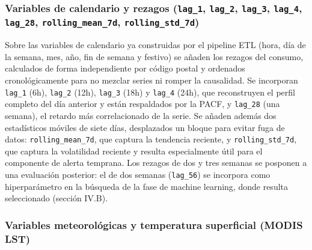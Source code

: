 \documentclass[12pt, a4paper]{article}
\begin{document}
\subsubsection{Variables de calendario y rezagos (\texttt{lag\_1}, \texttt{lag\_2}, \texttt{lag\_3}, \texttt{lag\_4}, \texttt{lag\_28}, \texttt{rolling\_mean\_7d}, \texttt{rolling\_std\_7d})}


Sobre las variables de calendario ya construidas por el pipeline ETL (hora, día de la semana, mes, año, fin de semana y festivo) se añaden los rezagos del consumo, calculados de forma independiente por código postal y ordenados cronológicamente para no mezclar series ni romper la causalidad. Se incorporan \texttt{lag\_1} (6h), \texttt{lag\_2} (12h), \texttt{lag\_3} (18h) y \texttt{lag\_4} (24h), que reconstruyen el perfil completo del día anterior y están respaldados por la PACF, y \texttt{lag\_28} (una semana), el retardo más correlacionado de la serie. Se añaden además dos estadísticos móviles de siete días, desplazados un bloque para evitar fuga de datos: \texttt{rolling\_mean\_7d}, que captura la tendencia reciente, y \texttt{rolling\_std\_7d}, que captura la volatilidad reciente y resulta especialmente útil para el componente de alerta temprana. Los rezagos de dos y tres semanas se posponen a una evaluación posterior: el de dos semanas (\texttt{lag\_56}) se incorpora como hiperparámetro en la búsqueda de la fase de machine learning, donde resulta seleccionado (sección IV.B).

\subsubsection{Variables meteorológicas y temperatura superficial (MODIS LST)}
\end{document}
